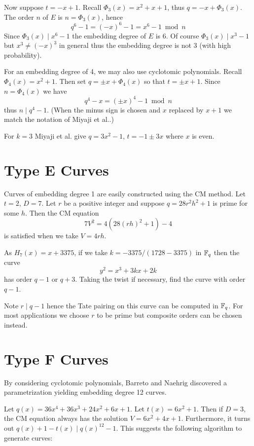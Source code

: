 Now suppose $t = -x + 1$.
Recall $\Phi_3(x) = x^2 + x + 1$, thus
$q = -x + \Phi_3(x)$.
The order $n$ of $E$ is $n = \Phi_3(x)$, hence
\[ q^6 - 1 = (-x)^6 - 1 = x^6 - 1 \bmod n \]
Since $\Phi_3(x) \mid x^6 - 1$ the embedding degree of $E$ is 6.
Of course $\Phi_3(x) \mid x^3 - 1$ but $x^3 \ne (-x)^3$ in general
thus the embedding degree is not 3 (with high probability).

For an embedding degree of 4, we may also use cyclotomic polynomials.
Recall $\Phi_4(x) = x^2 + 1$. Then set $q = \pm x + \Phi_4(x)$
so that $t = \pm x + 1$. Since $n = \Phi_4(x)$ we have
\[ q^4 - x = (\pm x)^4 - 1 \bmod n \]
thus $n \mid q^4 - 1$.
(When the minus sign is chosen and $x$ replaced by $x+1$ 
we match the notation of Miyaji et al.\cite{mnt}.)

For $k=3$ Miyaji et al. give $q = 3 x^2 - 1$, $t = -1 \pm 3x$ where $x$ is
even.

\section {Type E Curves}

Curves of embedding degree 1 are easily constructed using the CM method.
Let $t = 2$, $D = 7$. Let $r$ be a positive integer
and suppose $q = 28 r^2 h^2 + 1$ is prime for some $h$.
Then the CM equation
\[
7 V^2 = 4 (28 (r h)^2 + 1) - 4
\]
is satisfied when we take $V = 4 r h$.

As $H_7(x) = x + 3375$, if we take $k = -3375 / (1728 - 3375)$ in $\mathbb{F}_q$
then the curve
\[
y^2 = x^3 + 3k x + 2k
\]
has order $q - 1$ or $q + 3$. Taking the twist if necessary,
find the curve with order $q-1$.

Note $r \mid q-1$ hence the Tate pairing on this curve can be computed
in $\mathbb{F}_q$. For most applications we choose $r$ to be prime but composite
orders can be chosen instead.

\section {Type F Curves}

By considering cyclotomic polynomials,
Barreto and Naehrig discovered a parametrization yielding embedding
degree 12 curves.

Let $q(x) = 36x^4 + 36x^3 + 24x^2 + 6x + 1$. Let $t(x) = 6x^2 + 1$.
Then if $D = 3$, the CM equation always has the solution
$V = 6x^2 + 4x + 1$. Furthermore,
it turns out $q(x) + 1 - t(x) \mid q(x)^{12} - 1$.
This suggests the following algorithm to generate curves:

